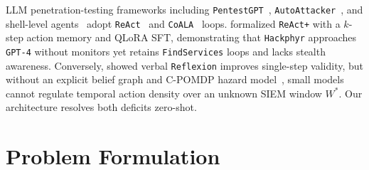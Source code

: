 \documentclass[a4paper,fleqn]{cas-dc}
\begin{document}
LLM penetration-testing frameworks including \texttt{PentestGPT}~\citep{deng2024pentestgpt}, \texttt{AutoAttacker}~\citep{xu2024autoattacker}, and shell-level agents~\citep{happe2023getting} adopt \texttt{ReAct}~\citep{yao2023react} and \texttt{CoALA}~\citep{sumers2024coala} loops. \citet{rigaki2026building} formalized \texttt{ReAct+} with a $k$-step action memory and QLoRA SFT, demonstrating that \texttt{Hackphyr} approaches \texttt{GPT-4} without monitors yet retains \texttt{FindServices} loops and lacks stealth awareness. Conversely, \citet{shinn2023reflexion} showed verbal \texttt{Reflexion} improves single-step validity, but without an explicit belief graph and C-POMDP hazard model~\citep{altman1999cmdp,kaelbling1998pomdp}, small models cannot regulate temporal action density over an unknown SIEM window $W^*$. Our architecture resolves both deficits zero-shot.

\section{Problem Formulation}
\label{sec:formulation}
\end{document}
